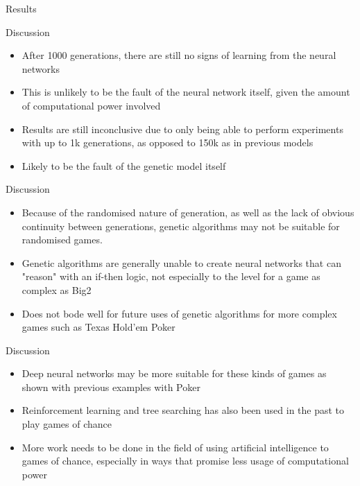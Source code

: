 \documentclass{beamer}
\begin{document}
\begin{frame}{Results}
\end{frame}	

\begin{frame}{Discussion}
	\begin{itemize}
		\item After 1000 generations, there are still no signs of learning from the neural networks
		\item This is unlikely to be the fault of the neural network itself, given the amount of computational power involved
		\item Results are still inconclusive due to only being able to perform experiments with up to 1k generations, as opposed to 150k as in previous models \cite{big2ai}
		\item Likely to be the fault of the genetic model itself
	\end{itemize}
\end{frame}

\begin{frame}{Discussion}
	\begin{itemize}
		\item Because of the randomised nature of generation, as well as the lack of obvious continuity between generations, genetic algorithms may not be suitable for randomised games.
		\item Genetic algorithms are generally unable to create neural networks that can "reason" with an if-then logic, not especially to the level for a game as complex as Big2
		\item Does not bode well for future uses of genetic algorithms for more complex games such as Texas Hold'em Poker
	\end{itemize}
\end{frame}

\begin{frame}{Discussion}
	\begin{itemize}
		\item Deep neural networks may be more suitable for these kinds of games as shown with previous examples with Poker \cite{pokerai}
		\item Reinforcement learning and tree searching has also been used in the past to play games of chance \cite{big2aitree}
		\item More work needs to be done in the field of using artificial intelligence to games of chance, especially in ways that promise less usage of computational power
	\end{itemize}
\end{frame}
\end{document}
